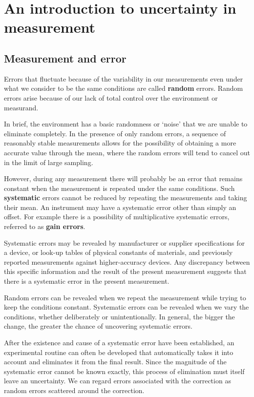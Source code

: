 \section{An introduction to uncertainty in measurement}

\subsection{Measurement and error}

Errors that fluctuate because of the variability in our measurements even under what we consider to be the same conditions are called \textbf{random} errors. Random errors arise because of our lack of total control over the environment or measurand.


In brief, the environment has a basic randomness or `noise' that we are unable to eliminate completely. In the presence of only random errors, a sequence of reasonably stable measurements allows for the possibility of obtaining a more accurate value through the mean, where the random errors will tend to cancel out in the limit of large sampling.


However, during any measurement there will probably be an error that remains constant when the measurement is repeated under the same conditions. Such \textbf{systematic} errors cannot be reduced by repeating the measurements and taking their mean. An instrument may have a systematic error other than simply an offset. For example there is a possibility of multiplicative systematic errors, referred to as \textbf{gain errors}.


Systematic errors may be revealed by manufacturer or supplier specifications for a device, or look-up tables of physical constants of materials, and previously reported measurements against higher-accuracy devices. Any discrepancy between this specific information and the result of the present measurement suggests that there is a systematic error in the present measurement.


Random errors can be revealed when we repeat the measurement while trying to keep the conditions constant. Systematic errors can be revealed when we vary the conditions, whether deliberately or unintentionally. In general, the bigger the change, the greater the chance of uncovering systematic errors. 


After the existence and cause of a systematic error have been established, an experimental routine can often be developed that automatically takes it into account and eliminates it from the final result. Since the magnitude of the systematic error cannot be known exactly, this process of elimination must itself leave an uncertainty. We can regard errors associated with the correction as random errors scattered around the correction.


